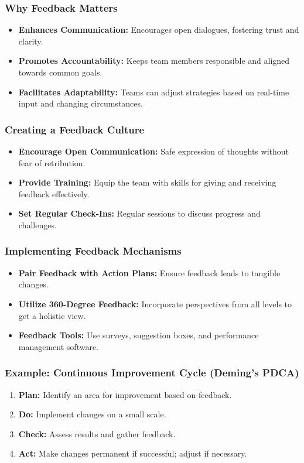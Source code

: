 \documentclass[aspectratio=169]{beamer}
\begin{document}
\begin{frame}[fragile]
    \frametitle{Why Feedback Matters}
    \begin{itemize}
        \item \textbf{Enhances Communication:} Encourages open dialogues, fostering trust and clarity.
        \item \textbf{Promotes Accountability:} Keeps team members responsible and aligned towards common goals.
        \item \textbf{Facilitates Adaptability:} Teams can adjust strategies based on real-time input and changing circumstances.
    \end{itemize}
\end{frame}

\begin{frame}[fragile]
    \frametitle{Creating a Feedback Culture}
    \begin{itemize}
        \item \textbf{Encourage Open Communication:} Safe expression of thoughts without fear of retribution.
        \item \textbf{Provide Training:} Equip the team with skills for giving and receiving feedback effectively.
        \item \textbf{Set Regular Check-Ins:} Regular sessions to discuss progress and challenges.
    \end{itemize}
\end{frame}

\begin{frame}[fragile]
    \frametitle{Implementing Feedback Mechanisms}
    \begin{itemize}
        \item \textbf{Pair Feedback with Action Plans:} Ensure feedback leads to tangible changes.
        \item \textbf{Utilize 360-Degree Feedback:} Incorporate perspectives from all levels to get a holistic view.
        \item \textbf{Feedback Tools:} Use surveys, suggestion boxes, and performance management software.
    \end{itemize}
\end{frame}

\begin{frame}[fragile]
    \frametitle{Example: Continuous Improvement Cycle (Deming's PDCA)}
    \begin{enumerate}
        \item \textbf{Plan:} Identify an area for improvement based on feedback.
        \item \textbf{Do:} Implement changes on a small scale.
        \item \textbf{Check:} Assess results and gather feedback.
        \item \textbf{Act:} Make changes permanent if successful; adjust if necessary.
    \end{enumerate}
\end{frame}
\end{document}

